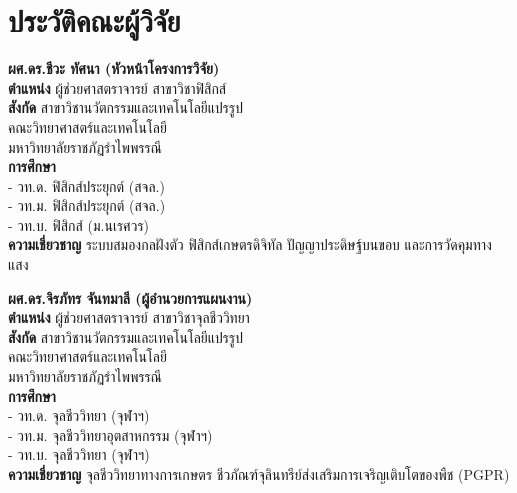 \documentclass[12pt,a4paper,oneside]{book}
\begin{document}
\backmatter

\chapter*{ประวัติคณะผู้วิจัย}

\begin{center}
\begin{minipage}{0.48\textwidth}
\textbf{ผศ.ดร.ชีวะ ทัศนา (หัวหน้าโครงการวิจัย)}\\
{\small
\textbf{ตำแหน่ง} ผู้ช่วยศาสตราจารย์ สาขาวิชาฟิสิกส์\\
\textbf{สังกัด} สาขาวิชานวัตกรรมและเทคโนโลยีแปรรูป\\
คณะวิทยาศาสตร์และเทคโนโลยี\\
มหาวิทยาลัยราชภัฏรำไพพรรณี\\
\textbf{การศึกษา}\\
- วท.ด. ฟิสิกส์ประยุกต์ (สจล.)\\
- วท.ม. ฟิสิกส์ประยุกต์ (สจล.)\\
- วท.บ. ฟิสิกส์ (ม.นเรศวร)\\
\textbf{ความเชี่ยวชาญ} ระบบสมองกลฝังตัว ฟิสิกส์เกษตรดิจิทัล ปัญญาประดิษฐ์บนขอบ และการวัดคุมทางแสง
}
\end{minipage}
\hfill
\begin{minipage}{0.48\textwidth}
\textbf{ผศ.ดร.จิรภัทร จันทมาลี (ผู้อำนวยการแผนงาน)}\\
{\small
\textbf{ตำแหน่ง} ผู้ช่วยศาสตราจารย์ สาขาวิชาจุลชีววิทยา\\
\textbf{สังกัด} สาขาวิชานวัตกรรมและเทคโนโลยีแปรรูป\\
คณะวิทยาศาสตร์และเทคโนโลยี\\
มหาวิทยาลัยราชภัฏรำไพพรรณี\\
\textbf{การศึกษา}\\
- วท.ด. จุลชีววิทยา (จุฬาฯ)\\
- วท.ม. จุลชีววิทยาอุตสาหกรรม (จุฬาฯ)\\
- วท.บ. จุลชีววิทยา (จุฬาฯ)\\
\textbf{ความเชี่ยวชาญ} จุลชีววิทยาทางการเกษตร ชีวภัณฑ์จุลินทรีย์ส่งเสริมการเจริญเติบโตของพืช (PGPR)
}
\end{minipage}
\end{center}
\end{document}
